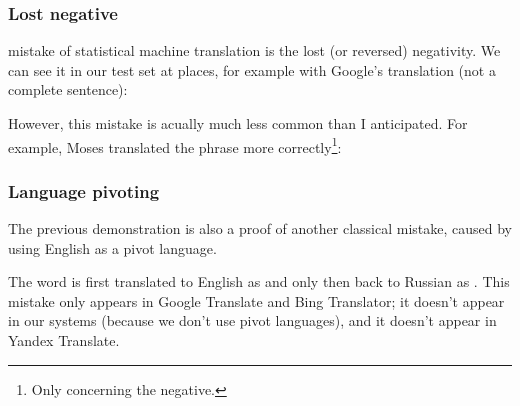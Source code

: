 \subsubsection{Lost negative}
 mistake of statistical machine translation is the lost (or reversed) negativity. We can see it in our test set at places, for example with Google's translation (not a complete sentence):

However, this mistake is acually much less common than I anticipated. For example, Moses translated the phrase more correctly\footnote{Only concerning the negative.}:
\subsubsection{Language pivoting}
The previous demonstration is also a proof of another classical mistake, caused by using English as a pivot language. 



The word  is first translated to English as  and only then back to Russian as . This mistake only appears in Google Translate and Bing Translator; it doesn't appear in our systems (because we don't use pivot languages), and it doesn't appear in Yandex Translate.



